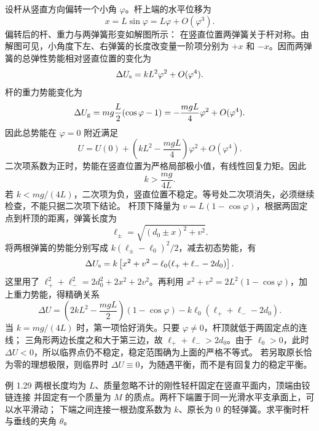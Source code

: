 \begin{xesolution}
设杆从竖直方向偏转一个小角 $\varphi$。杆上端的水平位移为
\[
  x=L\sin\varphi=L\varphi+O(\varphi^3).
\]
\Needspace{66mm}
偏转后的杆、重力与两弹簧形变如解图所示：
\soldiagOneTwentyEight
在竖直位置两弹簧关于杆对称。由解图可见，小角度下左、右弹簧的长度改变量一阶项分别为
$+x$ 和 $-x$。因而两弹簧的总弹性势能相对竖直位置的变化为
\[
  \Delta U_{\rm s}=kL^2\varphi^2+O(\varphi^4).
\]
杆的重力势能变化为
\[
  \Delta U_{\rm g}=mg\frac L2(\cos\varphi-1)
  =-\frac{mgL}{4}\varphi^2+O(\varphi^4).
\]
因此总势能在 $\varphi=0$ 附近满足
\[
  U=U(0)+\left(kL^2-\frac{mgL}{4}\right)\varphi^2+O(\varphi^4).
\]
二次项系数为正时，势能在竖直位置为严格局部极小值，有线性回复力矩。因此
\[
  \boxed{k>\frac{mg}{4L}}.
\]
若 $k<mg/(4L)$，二次项为负，竖直位置不稳定。等号处二次项消失，必须继续检查，不能只据二次项下结论。
杆顶下降量为 $v=L(1-\cos\varphi)$，根据两固定点到杆顶的距离，弹簧长度为
\[
 \ell_\pm=\sqrt{(d_0\pm x)^2+v^2}.
\]
将两根弹簧的势能分别写成 $k(\ell_\pm-\ell_0)^2/2$，减去初态势能，有
\[
 \Delta U_{\rm s}
 =k\left[x^2+v^2-\ell_0(\ell_++\ell_--2d_0)\right].
\]
这里用了 $\ell_+^2+\ell_-^2=2d_0^2+2x^2+2v^2$。再利用
$x^2+v^2=2L^2(1-\cos\varphi)$，加上重力势能，得精确关系
\[
 \Delta U=\left(2kL^2-\frac{mgL}{2}\right)(1-\cos\varphi)
 -k\ell_0(\ell_++\ell_--2d_0).
\]
当 $k=mg/(4L)$ 时，第一项恰好消失。只要 $\varphi\ne0$，杆顶就低于两固定点的连线；
三角形两边长度之和大于第三边，故 $\ell_++\ell_->2d_0$。由于 $\ell_0>0$，此时
$\Delta U<0$，所以临界点仍不稳定，稳定范围确为上面的严格不等式。
若另取原长恰为零的理想极限，则临界时 $\Delta U\equiv0$，为随遇平衡，而不是有回复力的稳定平衡。
\end{xesolution}

\begin{origexamplebox}{例 1.29}
两根长度均为 $L$、质量忽略不计的刚性轻杆固定在竖直平面内，顶端由铰链连接
并固定有一个质量为 $M$ 的质点。两杆下端置于同一光滑水平支承面上，可以水平滑动；
下端之间连接一根劲度系数为 $k$、原长为 0 的轻弹簧。求平衡时杆与垂线的夹角 $\theta$。
\end{origexamplebox}

